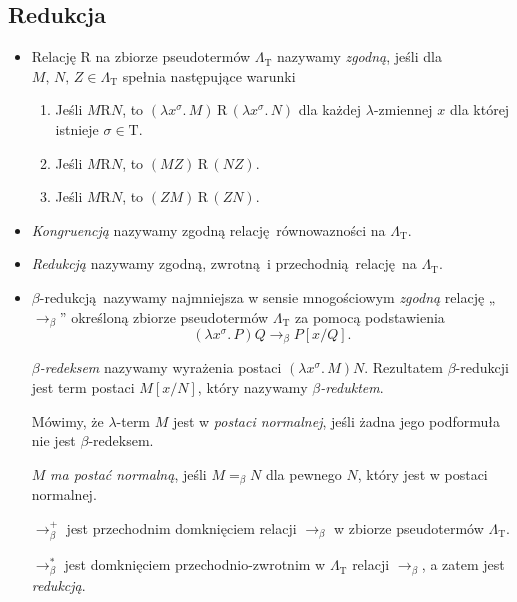 \subsection{Redukcja}
\begin{definicja}
\begin{itemize}

  \item Relację \(\mathrm{R}\) na zbiorze pseudotermów \(\Lambda_{\mathrm{T}}\) nazywamy \emph{zgodną}, jeśli dla \(M,\,N,\,Z\in\Lambda_{\mathrm{T}}\) spełnia następujące warunki

  \begin{enumerate}[label=({\alph*})]
    \item Jeśli \(M\mathrm{R} N\), to \((\lambda x^\sigma.\,M)\, \mathrm{R}\, (\lambda x^\sigma.\, N)\) dla każdej \(\lambda\)-zmiennej \(x\) dla której istnieje \(\sigma\in \mathrm{T}\).
    \item Jeśli \(M\mathrm{R} N\), to \((MZ)\,\mathrm{R}\, (NZ)\).
    \item Jeśli \(M\mathrm{R} N\), to \((ZM)\,\mathrm{R}\, (ZN)\).
  \end{enumerate}
  \item \emph{Kongruencją} nazywamy zgodną relację równowazności na \(\Lambda_{\mathrm{T}}\).
  \item \emph{Redukcją} nazywamy zgodną, zwrotną i przechodnią relację na \(\Lambda_{\mathrm{T}}\).

\item \(\beta\)-redukcją nazywamy najmniejsza w sensie mnogościowym \emph{zgodną} relację „\(\longrightarrow_{\beta}\)” określoną zbiorze pseudotermów \(\Lambda_{\mathrm{T}}\) za pomocą podstawienia
  \[
    (\lambda x^\sigma.\,P)Q \longrightarrow_{\beta} P[x/Q].
  \]
  
    \emph{\(\beta\)-redeksem} nazywamy wyrażenia postaci \((\lambda x^\sigma.\, M)N\). Rezultatem \(\beta\)-redukcji jest term postaci \(M[x/N]\), który nazywamy \emph{\(\beta\)-reduktem}.

    Mówimy, że \(\lambda\)-term \(M\) jest w \emph{postaci normalnej}, jeśli żadna jego podformuła nie jest \(\beta\)-redeksem. 
    
    \(M\) \emph{ma postać normalną}, jeśli \(M=_{\beta}N\) dla pewnego \(N\), który jest w postaci normalnej.


    \(\longrightarrow^{+}_{\beta}\) jest przechodnim domknięciem relacji \(\longrightarrow_{\beta}\) w zbiorze pseudotermów \(\Lambda_{\mathrm{T}}\).

    \(\longrightarrow^{*}_{\beta}\) jest domknięciem przechodnio-zwrotnim w \(\Lambda_{\mathrm{T}}\) relacji \(\longrightarrow_{\beta}\), a zatem jest \emph{redukcją}. 


\end{itemize}
\end{definicja}
